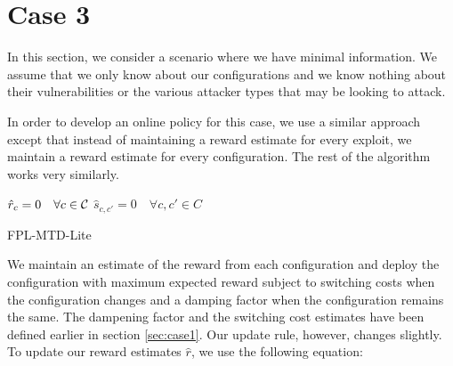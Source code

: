 \section{Case 3}
In this section, we consider a scenario where we have minimal information. We assume that we only know about our configurations and we know nothing about their vulnerabilities or the various attacker types that may be looking to attack. 

In order to develop an online policy for this case, we use a similar approach except that instead of maintaining a reward estimate for every exploit, we maintain a reward estimate for every configuration. The rest of the algorithm works very similarly. 



\begin{algorithm}
\DontPrintSemicolon
$\hat{r}_{c} = 0 \quad \forall c \in \cal C$\;
$\hat{s}_{c, c'} = 0 \quad \forall c, c' \in C$\;
\caption{FPL-MTD-Lite}
\label{alg:fpl-mtd-lite}
\end{algorithm}

We maintain an estimate of the reward from each configuration and deploy the configuration with maximum expected reward subject to switching costs when the configuration changes and a damping factor when the configuration remains the same. The dampening factor and the switching cost estimates have been defined earlier in section \ref{sec:case1}. Our update rule, however, changes slightly. To update our reward estimates $\hat{r}$, we use the following equation:

